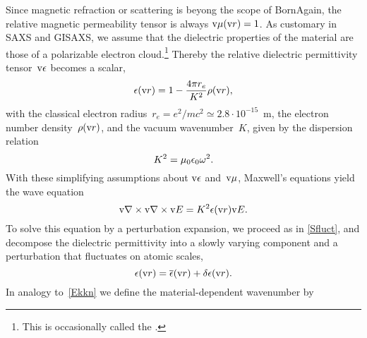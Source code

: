 Since magnetic refraction or scattering is beyong the scope of BornAgain,
the relative magnetic permeability tensor is always $\text{v}{\mu}(\text{v}{r})=1$.
%
%
As customary in SAXS and GISAXS,
%
%
we assume
that the dielectric properties of the material are those of a polarizable electron cloud.\footnote
{This is occasionally called the 
%
 \cite{Lau31}.}
Thereby the relative dielectric permittivity tensor~$\text{v}{\epsilon}$
%
%
becomes a scalar,
\begin{equation}
  \epsilon(\text{v}{r})=1-\frac{4\pi r_e}{K^2}\rho(\text{v}{r}),
\end{equation}
%
%
with the classical electron radius~$r_e=e^2/mc^2\simeq2.8\cdot10^{-15}$~m,
%
%
%
the electron number density~$\rho(\text{v}{r})$,
%
%
%
and the vacuum wavenumber~$K$,
given by the dispersion relation
\begin{equation}
  K^2 = \mu_0\epsilon_0\omega^2.
\end{equation}
%
With these simplifying assumptions about $\text{v}{\epsilon}$ and~$\text{v}{\mu}$,
Maxwell's equations yield the wave equation
\begin{equation}\label{ENabNabE}
  \text{v}{\nabla}\times\text{v}{\nabla}\times\text{v}{E} = K^2\epsilon(\text{v}{r})\text{v}{E}.
\end{equation}
%
%
To solve this equation by a perturbation expansion,
%
we proceed as in \cref{Sfluct},
and decompose the dielectric permittivity
into a slowly varying component and a perturbation that fluctuates on atomic scales,
\begin{equation}
  \epsilon(\text{v}{r}) = \overline{\epsilon}(\text{v}{r}) + \delta\epsilon(\text{v}{r}).
\end{equation}
%
%
In analogy to~\cref{Ekkn} we define the material-dependent wavenumber by
%
